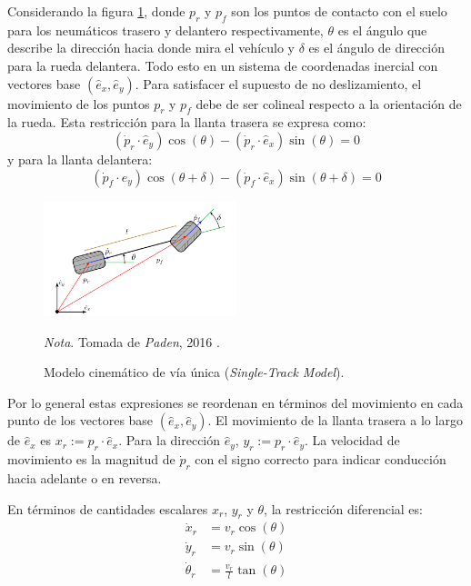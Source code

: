 Considerando la figura \ref{fig:single_track_model}, donde $p_r$ y $p_f$ son los puntos de contacto con el suelo para los neumáticos trasero y delantero respectivamente, $\theta$ es el ángulo que describe la dirección hacia donde mira el vehículo y $\delta$ es el ángulo de dirección para la rueda delantera. Todo esto en un sistema de coordenadas inercial con vectores base $(\hat{e}_{x}, \hat{e}_{y})$.
Para satisfacer el supuesto de no deslizamiento, el movimiento de los puntos $p_r$ y $p_f$ debe de ser colineal respecto a la orientación de la rueda. Esta restricción para la llanta trasera se expresa como:
\begin{equation}
    (\dot{p}_r \cdot \hat{e}_y)\cos{(\theta)} - (\dot{p}_r \cdot \hat{e}_x)\sin{(\theta)} = 0
\end{equation}
y para la llanta delantera:
\begin{equation}
    (\dot{p}_f \cdot \hat{e}_y)\cos{(\theta + \delta)} - (\dot{p}_f \cdot \hat{e}_x)\sin{(\theta + \delta)} = 0
\end{equation}

\begin{figure}[h]
    \centering
    \includegraphics[width=0.5\textwidth]{Figures/Figures_Cap04/single_track_model.png}
    \caption{Modelo cinemático de vía única (\textit{Single-Track Model}).}
    \textit{Nota}. Tomada de \textit{Paden}, 2016 \cite{paden2016survey}.
    \label{fig:single_track_model}
\end{figure}


Por lo general estas expresiones se reordenan en términos del movimiento en cada punto de los vectores base $(\hat{e}_{x}, \hat{e}_{y})$. El movimiento de la llanta trasera a lo largo de $\hat{e}_{x}$ es $x_r := p_r \cdot \hat{e}_x$. Para la dirección $\hat{e}_{y}$, $y_r := p_r \cdot \hat{e}_y$. La velocidad de movimiento es la magnitud de $\dot{p}_r$ con el signo correcto para indicar conducción hacia adelante o en reversa. 

En términos de cantidades escalares $x_r$, $y_r$ y $\theta$, la restricción diferencial es:
\begin{equation}
    \begin{split}
        \dot{x}_r & = v_r \cos{(\theta)} \\
        \dot{y}_r & = v_r \sin{(\theta)} \\
        \dot{\theta}_r & = \frac{v_r}{l}\tan{(\theta)}
    \end{split}
\end{equation}


